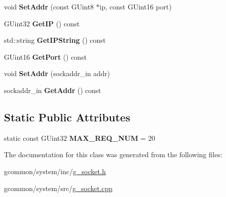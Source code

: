 \begin{DoxyCompactItemize}
\item 
\hypertarget{class_socket_a8ac03a9278f552e4d5cecf71ea727b57}{void {\bfseries Set\-Addr} (const G\-Uint8 $\ast$ip, const G\-Uint16 port)}\label{class_socket_a8ac03a9278f552e4d5cecf71ea727b57}

\item 
\hypertarget{class_socket_a4b7e0b5e55d45d107948a110c8a0cc02}{G\-Uint32 {\bfseries Get\-I\-P} () const }\label{class_socket_a4b7e0b5e55d45d107948a110c8a0cc02}

\item 
\hypertarget{class_socket_ae6a8c5d26e99f2522d540a281524b9c5}{std\-::string {\bfseries Get\-I\-P\-String} () const }\label{class_socket_ae6a8c5d26e99f2522d540a281524b9c5}

\item 
\hypertarget{class_socket_a88e310ab960ad8fa96e67ddcb215bcaf}{G\-Uint16 {\bfseries Get\-Port} () const }\label{class_socket_a88e310ab960ad8fa96e67ddcb215bcaf}

\item 
\hypertarget{class_socket_a641add9fc8f9d5994242514344689597}{void {\bfseries Set\-Addr} (sockaddr\-\_\-in addr)}\label{class_socket_a641add9fc8f9d5994242514344689597}

\item 
\hypertarget{class_socket_af131e419dc81d5e34999a4a3d10a53ca}{sockaddr\-\_\-in {\bfseries Get\-Addr} () const }\label{class_socket_af131e419dc81d5e34999a4a3d10a53ca}

\end{DoxyCompactItemize}
\subsection*{Static Public Attributes}
\begin{DoxyCompactItemize}
\item 
\hypertarget{class_socket_a3c7455b9921b9d5af6100f25aa31c9a3}{static const G\-Uint32 {\bfseries M\-A\-X\-\_\-\-R\-E\-Q\-\_\-\-N\-U\-M} = 20}\label{class_socket_a3c7455b9921b9d5af6100f25aa31c9a3}

\end{DoxyCompactItemize}


The documentation for this class was generated from the following files\-:\begin{DoxyCompactItemize}
\item 
gcommon/system/inc/\hyperlink{g__socket_8h}{g\-\_\-socket.\-h}\item 
gcommon/system/src/\hyperlink{g__socket_8cpp}{g\-\_\-socket.\-cpp}\end{DoxyCompactItemize}
